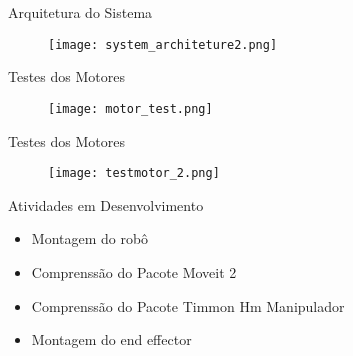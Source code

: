 \begin{frame}[t]{Arquitetura do Sistema}

    \begin{center}
        \begin{figure}
            \texttt{[image: system\_architeture2.png]}
            
        \end{figure}
        
    \end{center}
   
\end{frame}


\begin{frame}[t]{Testes dos Motores}
    
    \begin{center}
        \begin{figure}
            \texttt{[image: motor\_test.png]}
            
        \end{figure}
        
    \end{center}
   
\end{frame}


\begin{frame}[t]{Testes dos Motores}
    
    \begin{center}
        \begin{figure}
            \texttt{[image: testmotor\_2.png]}
            
        \end{figure}
        
    \end{center}
   
\end{frame}



\begin{frame}[t]{Atividades em Desenvolvimento}
    
    \begin{center}
        \begin{itemize}
            \item Montagem do robô
            \item Comprenssão do Pacote  Moveit 2 
            \item Comprenssão do Pacote Timmon Hm Manipulador
            \item Montagem do end effector
        \end{itemize}
        
    \end{center}
   
\end{frame}
